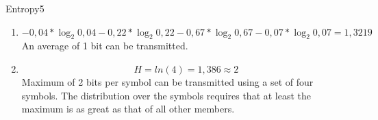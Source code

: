\begin{questions}
	
	\begin{question}{Entropy}{5}		
	\begin{answer} 
			\begin{enumerate}
		\item \begin{equation}
 - 0,04 * {\log_2 0,04}  - 0,22 * {\log_2 0,22} - 0,67 * {\log_2 0,67} - 0,07 * {\log_2 0,07} = 1,3219   
\end{equation}
An average of 1 bit can be transmitted.
		\item 
		\begin{equation}
		H = ln(4) = 1,386 \approx 2
		\end{equation}
		Maximum of 2 bits per symbol can be transmitted using a set of four symbols. 
		The distribution over the symbols requires that at least the maximum is as great as that of all other members.
		\end{enumerate}
		
	\end{answer}
		
	\end{question}
	
\end{questions}

